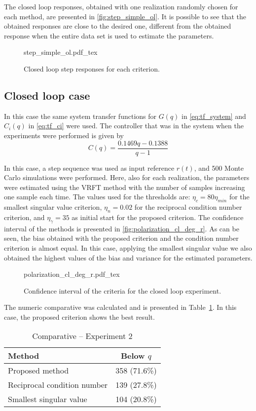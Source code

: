 The closed loop responses, obtained with one realization randomly chosen for each method, are presented in \autoref{fig:step_simple_ol}.
It is possible to see that the obtained responses are close to the desired one, different from the obtained response when the entire data set is used to estimate the parameters.
\begin{figure}[h!]
  \centering
  \def\svgwidth{\columnwidth}
  {\footnotesize{step_simple_ol.pdf_tex}}
  \caption{\label{fig:step_simple_ol} Closed loop step responses for each criterion.}
\end{figure}


\subsection{Closed loop case}
In this case the same system transfer functions for $G(q)$ in \eqref{eq:tf_system} and $C_i(q)$ in \eqref{eq:tf_ci} were used.
The controller that was in the system when the experiments were performed is given by
\begin{equation*}
	C(q) = \frac{0.1469q - 0.1388}{q-1}
\end{equation*}

In this case, a step sequence was used as input reference $r(t)$, and 500 Monte Carlo simulations were performed.
Here, also for each realization, the parameters were estimated using the VRFT method with the number of samples increasing one sample each time.
The values used for the thresholds are: $\eta_c = 80\eta_{min} $ for the smallest singular value criterion, $\eta_n = 0.02$ for the reciprocal condition number criterion, and $\eta_\gamma = 35$ as initial start for the proposed criterion.
The confidence interval of the methods is presented in \autoref{fig:polarization_cl_deg_r}.
As can be seen, the bias obtained with the proposed criterion and the condition number criterion is almost equal.
In this case, applying the smallest singular value we also obtained the highest values of the bias and variance for the estimated parameters.
\begin{figure}[h!]
  \centering
  \def\svgwidth{\columnwidth}
  {\footnotesize{polarization_cl_deg_r.pdf_tex}}
  \caption{\label{fig:polarization_cl_deg_r} Confidence interval of the criteria for the closed loop experiment.}
\end{figure}

The numeric comparative was calculated and is presented in Table~\ref{tab:comp_cl_deg_r}.
In this case, the proposed criterion shows the best result.
\begin{table}[h!]
\caption{Comparative -- Experiment 2 \label{tab:comp_cl_deg_r}}
\centering
\begin{tabular}{lc}
\toprule
Method & Below $q$\\
\midrule
Proposed method & 358 (71.6\%) \\
Reciprocal condition number & 139 (27.8\%) \\
Smallest singular value & 104 (20.8\%) \\
\bottomrule
\end{tabular}
\end{table}

